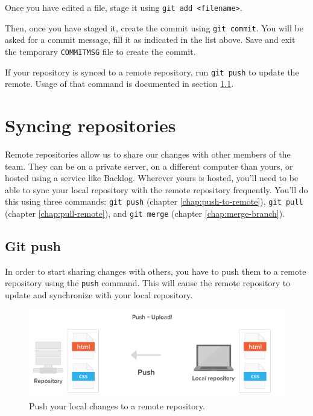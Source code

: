 \documentclass[10pt,a4paper,english]{report}
\begin{document}
    Once you have edited a file, stage it using \verb|git add <filename>|.

    Then, once you have staged it, create the commit using \verb|git commit|. You will be asked for a commit message, fill it as indicated in the list above. Save and exit the temporary \verb|COMMITMSG| file to create the commit.

    If your repository is synced to a remote repository, run \verb|git push| to update the remote. Usage of that command is documented in section \ref{sec:push}.

\chapter{Syncing repositories}

    Remote repositories allow us to share our changes with other members of the team. They can be on a private server, on a different computer than yours, or hosted using a service like Backlog. Wherever yours is hosted, you'll need to be able to sync your local repository with the remote repository frequently. You'll do this using three commands: \verb|git push| (chapter \ref{chap:push-to-remote}), \verb|git pull| (chapter \ref{chap:pull-remote}), and \verb|git merge| (chapter \ref{chap:merge-branch}).

    \section{Git push}
    \label{sec:push}

    In order to start sharing changes with others, you have to push them to a remote repository using the \verb"push" command. This will cause the remote repository to update and synchronize with your local repository.

    \begin{figure}[ht]
    \begin{center}
    \includegraphics[scale=0.5]{images/syncing_repositories_001.png}
    \end{center}
    \caption{Push your local changes to a remote repository.}
    \end{figure}
\end{document}
